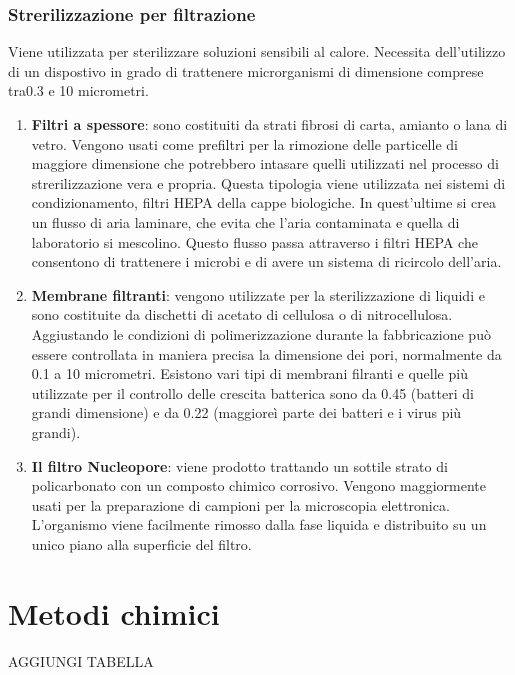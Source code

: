 \subsubsection{Strerilizzazione per filtrazione}
Viene utilizzata per sterilizzare soluzioni sensibili al calore. Necessita dell'utilizzo di un dispostivo in grado di trattenere microrganismi di dimensione comprese tra0.3 e 10 micrometri. 
\begin{enumerate}
    \item \textbf{Filtri a spessore}: sono costituiti da strati fibrosi di carta, amianto o lana di vetro. Vengono usati come prefiltri per la rimozione delle particelle di maggiore dimensione che potrebbero intasare quelli utilizzati nel processo di strerilizzazione vera e propria. Questa tipologia viene utilizzata nei sistemi di condizionamento, filtri HEPA della cappe biologiche. In quest'ultime si crea un flusso di aria laminare, che evita che l'aria contaminata e quella di laboratorio si mescolino. Questo flusso passa attraverso i filtri HEPA che consentono di trattenere i microbi e di avere un sistema di ricircolo dell'aria. 
    \item \textbf{Membrane filtranti}: vengono utilizzate per la sterilizzazione di liquidi e sono costituite da dischetti di acetato di cellulosa o di nitrocellulosa. Aggiustando le condizioni di polimerizzazione durante la fabbricazione può essere controllata in maniera precisa la dimensione dei pori, normalmente da 0.1 a 10 micrometri. Esistono vari tipi di membrani filranti e quelle più utilizzate per il controllo delle crescita batterica sono da 0.45 (batteri di grandi dimensione) e da 0.22 (maggioreì parte dei batteri e i virus più grandi). 
    \item \textbf{Il filtro Nucleopore}: viene prodotto trattando un sottile strato di policarbonato con un composto chimico corrosivo. Vengono maggiormente usati per la preparazione di campioni per la microscopia elettronica. L'organismo viene facilmente rimosso dalla fase liquida e distribuito su un unico piano alla superficie del filtro. 
\end{enumerate}
\section{Metodi chimici}
AGGIUNGI TABELLA
